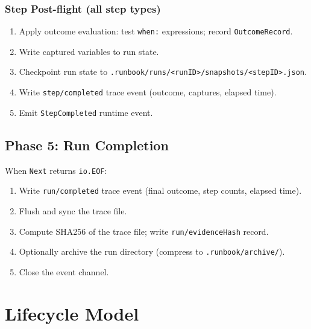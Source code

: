 \subsubsection*{Step Post-flight (all step types)}
\begin{enumerate}
  \item Apply outcome evaluation: test \texttt{when:} expressions; record \texttt{OutcomeRecord}.
  \item Write captured variables to run state.
  \item Checkpoint run state to \texttt{.runbook/runs/<runID>/snapshots/<stepID>.json}.
  \item Write \texttt{step/completed} trace event (outcome, captures, elapsed time).
  \item Emit \texttt{StepCompleted} runtime event.
\end{enumerate}

\subsection{Phase 5: Run Completion}

When \texttt{Next} returns \texttt{io.EOF}:
\begin{enumerate}
  \item Write \texttt{run/completed} trace event (final outcome, step counts, elapsed time).
  \item Flush and sync the trace file.
  \item Compute SHA256 of the trace file; write \texttt{run/evidenceHash} record.
  \item Optionally archive the run directory (compress to \texttt{.runbook/archive/}).
  \item Close the event channel.
\end{enumerate}

\section{Lifecycle Model}

